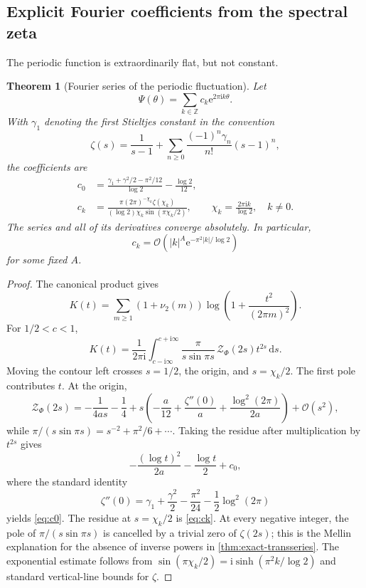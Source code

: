 \documentclass[11pt,oneside]{article}
\newtheorem{theorem}{Theorem}[section]
\theoremstyle{definition}
\theoremstyle{remark}
\newcommand{\Z}{\mathbb Z}
\newcommand{\e}{\mathrm e}
\newcommand{\ii}{\mathrm i}
\newcommand{\dd}{\,\mathrm d}
\newcommand{\bigO}{\mathcal O}
\begin{document}
\subsection{Explicit Fourier coefficients from the spectral zeta}

The periodic function is extraordinarily flat, but not constant.

\begin{theorem}[Fourier series of the periodic fluctuation]
\label{thm:Psi-Fourier}
Let
\[
 \Psi(\theta)=\sum_{k\in\Z}c_k\e^{2\pi\ii k\theta}.
\]
With \(\gamma_1\) denoting the first Stieltjes constant in the convention
\[
 \zeta(s)=\frac1{s-1}
 +\sum_{n\geq0}\frac{(-1)^n\gamma_n}{n!}(s-1)^n,
\]
the coefficients are
\begin{align}
 c_0
 &=
 \frac{\gamma_1+\gamma^2/2-\pi^2/12}{\log2}
 -\frac{\log2}{12},
 \label{eq:c0}\\
 c_k
 &=
 \frac{\pi(2\pi)^{-\chi_k}\zeta(\chi_k)}
      {(\log2)\chi_k\sin(\pi\chi_k/2)},
 \qquad
 \chi_k=\frac{2\pi\ii k}{\log2},
 \quad k\neq0.
 \label{eq:ck}
\end{align}
The series and all of its derivatives converge absolutely.  In particular,
\[
 c_k=\bigO\!\left(
  |k|^A\e^{-\pi^2|k|/\log2}
 \right)
\]
for some fixed \(A\).
\end{theorem}

\begin{proof}
The canonical product gives
\[
 K(t)=\sum_{m\geq1}(1+\nu_2(m))
       \log\!\left(1+\frac{t^2}{(2\pi m)^2}\right).
\]
For \(1/2<c<1\),
\[
 K(t)=\frac1{2\pi\ii}\int_{c-\ii\infty}^{c+\ii\infty}
 \frac{\pi}{s\sin\pi s}\,
 \mathcal Z_\Phi(2s)t^{2s}\dd s.
 \label{eq:K-Mellin}
\]
Moving the contour left crosses \(s=1/2\), the origin, and
\(s=\chi_k/2\).  The first pole contributes \(t\).  At the origin,
\[
 \mathcal Z_\Phi(2s)
 =-\frac1{4as}-\frac14
 +s\left(
   -\frac a{12}
   +\frac{\zeta''(0)}a
   +\frac{\log^2(2\pi)}{2a}
  \right)+\bigO(s^2),
\]
while
\(\pi/(s\sin\pi s)=s^{-2}+\pi^2/6+\cdots\).
Taking the residue after multiplication by \(t^{2s}\) gives
\[
 -\frac{(\log t)^2}{2a}-\frac{\log t}{2}+c_0,
\]
where the standard identity
\[
 \zeta''(0)
 =\gamma_1+\frac{\gamma^2}{2}
  -\frac{\pi^2}{24}
  -\frac12\log^2(2\pi)
\]
yields \eqref{eq:c0}.  The residue at \(s=\chi_k/2\) is
\eqref{eq:ck}.  At every negative integer, the pole of
\(\pi/(s\sin\pi s)\) is cancelled by a trivial zero of
\(\zeta(2s)\); this is the Mellin explanation for the absence of inverse
powers in \cref{thm:exact-transseries}.  The exponential estimate follows
from
\(\sin(\pi\chi_k/2)=\ii\sinh(\pi^2k/\log2)\) and standard vertical-line
bounds for \(\zeta\).
\end{proof}
\end{document}
